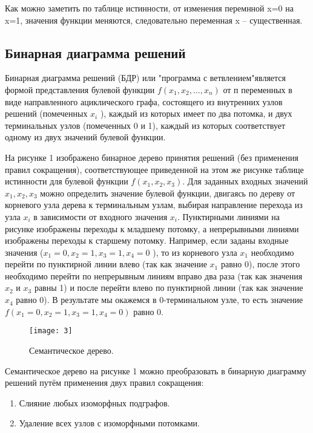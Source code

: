 \documentclass[10pt,a4paper,final]{article} %
\begin{document}
	\par Как можно заметить по таблице истинности, от изменения перемнной x=0 на x=1, значения функции меняются, следовательно переменная x -- существенная.
	
	\subsection {Бинарная диаграмма решений}
	
	Бинарная диаграмма решений (БДР) или "программа с ветвлением"является формой представления булевой функции $f\left(x_{1}, x_{2}, \ldots, x_{n}\right)$ от п переменных в виде направленного ациклического графа, состоящего из внутренних узлов решений (помеченных $x_{i}$ ), каждый из которых имеет по два потомка, и двух терминальных узлов (помеченных 0 и 1), каждый из которых соответствует одному из двух значений булевой функции.
	
	На рисунке 1 изображено бинарное дерево принятия решений (без применения правил сокращения), соответствующее приведенной на этом же рисунке таблице истинности для булевой функции $f\left(x_{1}, x_{2}, x_{3}\right)$. Для заданных входных значений $x_{1}, x_{2}, x_{3}$ можно определить значение булевой функции, двигаясь по дереву от корневого узла дерева к терминальным узлам, выбирая направление перехода из узла $x_{i}$ в зависимости от входного значения $x_{i}$. Пунктирными линиями на рисунке изображены переходы к младшему потомку, а непрерывными линиями изображены переходы к старшему потомку. Например, если заданы входные значения ($x_{1}=0, x_{2}=1, x_{3}=1, x_4=0$ ), то из корневого узла $x_{1}$ необходимо перейти по пунктирной линии влево (так как значение $x_{1}$ равно 0), после этого необходимо перейти по непрерывным линиям вправо два раза (так как значения $x_{2}$ и $x_{3}$ равны 1) и после перейти влево по пунктирной линии (так как значение $x_{4}$ равно 0). В результате мы окажемся в 0-терминальном узле, то есть значение $f\left(x_{1}=0, x_{2}=1, x_{3}=1, x_4=0\right)$ равно 0.
	
	\begin{figure}[h!]
		\centering
		\texttt{[image: 3]}
		\caption{Семантическое дерево.}
	\end{figure}

Семантическое дерево на рисунке 1 можно преобразовать в бинарную диаграмму решений путём применения двух правил сокращения:

\begin{enumerate}[itemsep=0pt,parsep=0pt,topsep=0pt,partopsep=0pt]
	\item Слияние любых изоморфных подграфов.
	\item Удаление всех узлов с изоморфными потомками.
\end{enumerate}
\end{document}
